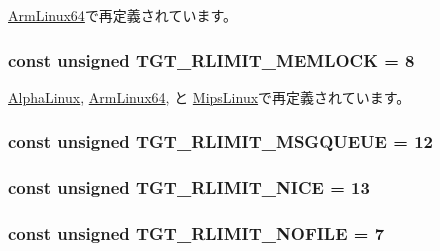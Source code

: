 \hyperlink{classArmLinux64_a599454267926920de3bd5a488bda3e03aabd123e8e2b5b10d6a26e053b938a3e6}{ArmLinux64}で再定義されています。\hypertarget{classLinux_acfa2b204cbb5bca2fbc2c1f15649aca2}{
\subsubsection[{TGT\_\-RLIMIT\_\-MEMLOCK}]{\setlength{\rightskip}{0pt plus 5cm}const unsigned {\bf TGT\_\-RLIMIT\_\-MEMLOCK} = 8}}
\label{classLinux_acfa2b204cbb5bca2fbc2c1f15649aca2}


\hyperlink{classAlphaLinux_acfa2b204cbb5bca2fbc2c1f15649aca2}{AlphaLinux}, \hyperlink{classArmLinux64_a599454267926920de3bd5a488bda3e03a1c5dcb48959f77f93f7c104f76b4b88d}{ArmLinux64}, と \hyperlink{classMipsLinux_acfa2b204cbb5bca2fbc2c1f15649aca2}{MipsLinux}で再定義されています。\hypertarget{classLinux_a9f8bde4350834d90717317d21b3b9c51}{
\subsubsection[{TGT\_\-RLIMIT\_\-MSGQUEUE}]{\setlength{\rightskip}{0pt plus 5cm}const unsigned {\bf TGT\_\-RLIMIT\_\-MSGQUEUE} = 12}}
\label{classLinux_a9f8bde4350834d90717317d21b3b9c51}
\hypertarget{classLinux_a23805c9c845a1a5023596d06fc7ee2e0}{
\subsubsection[{TGT\_\-RLIMIT\_\-NICE}]{\setlength{\rightskip}{0pt plus 5cm}const unsigned {\bf TGT\_\-RLIMIT\_\-NICE} = 13}}
\label{classLinux_a23805c9c845a1a5023596d06fc7ee2e0}
\hypertarget{classLinux_a7eca1a56bf2a00dce74320c95a0b176e}{
\subsubsection[{TGT\_\-RLIMIT\_\-NOFILE}]{\setlength{\rightskip}{0pt plus 5cm}const unsigned {\bf TGT\_\-RLIMIT\_\-NOFILE} = 7}}
\label{classLinux_a7eca1a56bf2a00dce74320c95a0b176e}


